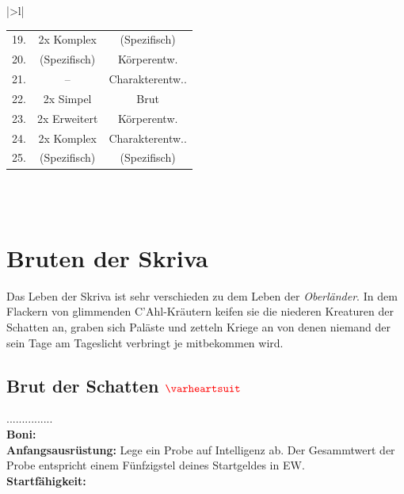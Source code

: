 \begin{table}[h!]
\begin{tabular}{|>{}l|}
\begin{tabular}{c|c|c}
            \rowcolor{myred} 19. & 2x Komplex & (Spezifisch)\\
            \rowcolor{mygreen} 20. & (Spezifisch) & Körperentw.\\
            \rowcolor{myred} 21. & -- & Charakterentw..\\
            \rowcolor{mygreen} 22. & 2x Simpel & Brut\\
            \rowcolor{myred} 23. & 2x Erweitert & Körperentw.\\
            \rowcolor{mygreen} 24. & 2x Komplex & Charakterentw..\\
            \rowcolor{myred} 25. & (Spezifisch) & (Spezifisch) \\
        \end{tabular}\\
        \\
        \btrule{1pt}
    \end{tabular}
\end{table}

\section*{Bruten der Skriva}
Das Leben der Skriva ist sehr verschieden zu dem Leben der \textit{Oberländer}. In dem Flackern von glimmenden C'Ahl-Kräutern keifen sie die niederen Kreaturen der Schatten an, graben sich Paläste und zetteln Kriege an von denen niemand der sein Tage am Tageslicht verbringt je mitbekommen wird.

\subsection*{Brut der Schatten $\Herz{}$}
...............\\
\textbf{Boni:} \\
\textbf{Anfangsausrüstung:} Lege ein Probe auf Intelligenz ab. Der Gesammtwert der Probe entspricht einem Fünfzigstel deines Startgeldes in EW.\\
\textbf{Startfähigkeit:}  \\

